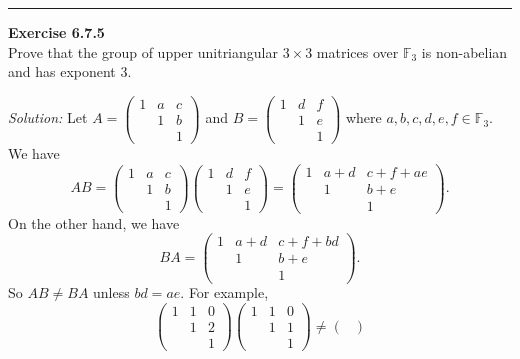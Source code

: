 \documentclass[a4paper, 12pt]{article}
\newenvironment{problem}[2][Exercise]
    { \begin{mdframed}[backgroundcolor=gray!20] \textbf{#1 #2} \\}
    {  \end{mdframed}}
\newenvironment{solution}
    {\textit{Solution:}}
    {}
\begin{document}
\noindent\rule{7in}{2.8pt}
\begin{problem}{6.7.5}
Prove that the group of upper unitriangular \(3\times 3\) matrices over \(\mathbb{F}_3\) is non-abelian and has exponent 3.
\end{problem}
\begin{solution}
Let \(A=\begin{pmatrix}
    1 &a&c\\ 
    & 1&b \\ 
  & & 1
\end{pmatrix}\) and \(B=\begin{pmatrix}
    1&d&f\\ 
    &1&e\\ 
    &&1
\end{pmatrix}\) where \(a,b,c,d,e,f\in \mathbb{F}_3\). We have 
\[AB=\begin{pmatrix}
    1&a&c\\ 
    &1&b\\ 
    &&1
\end{pmatrix}\begin{pmatrix}
    1&d&f\\ 
    &1&e\\ 
    &&1
\end{pmatrix}=\begin{pmatrix}
    1&a+d&c+f+ae\\ 
    &1&b+e\\ 
    &&1
\end{pmatrix}.\]
On the other hand, we have 
\[BA=\begin{pmatrix}
    1&a+d&c+f+bd\\ 
    &1&b+e\\ 
    &&1
\end{pmatrix}.\]
So \(AB\neq BA\) unless \(bd=ae\). For example, 
\[\begin{pmatrix}
    1&1&0\\ 
    &1&2\\ 
    &&1
\end{pmatrix}\begin{pmatrix}
    1&1&0\\ 
    &1&1\\ 
    &&1
\end{pmatrix}\neq \begin{pmatrix}

\end{pmatrix}\]
\end{solution}
\end{document}
